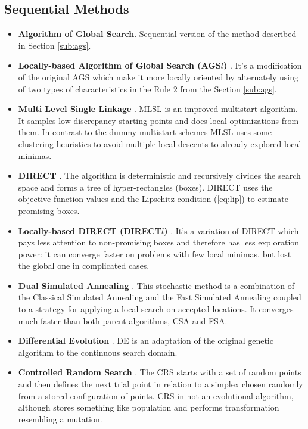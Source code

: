 \documentclass{svproc}
\begin{document}
\subsection{Sequential Methods}
\begin{itemize}
  \item \textbf{Algorithm of Global Search}. Sequential version of the method described in Section \ref{sub:ags}.

  \item \textbf{Locally-based Algorithm of Global Search (AGS\(l\))} \cite{indexMethod}. It's a modification of
  the original AGS which make it more locally oriented by alternately using of two types of characteristics in the Rule 2 from the Section \ref{sub:ags}.

  \item \textbf{Multi Level Single Linkage} \cite{Kan1987StochasticGO}. MLSL is an improved multistart algorithm.
  It samples low-discrepancy starting points and does local optimizations from them. In contrast to the dummy multistart schemes
  MLSL uses some clustering heuristics to avoid multiple local descents to already explored local minimas.

  \item \textbf{DIRECT} \cite{Jones2009}. The algorithm is deterministic and recursively divides the search space and forms a tree of hyper-rectangles (boxes). DIRECT uses the objective function values and the Lipschitz condition (\ref{eq:lip}) to estimate promising boxes.

  \item \textbf{Locally-based DIRECT (DIRECT$l$)} \cite{Gablonsky2001}. It's a variation of DIRECT which pays less attention to non-promising boxes and therefore
  has less exploration power: it can converge faster on problems with few local minimas, but lost the global one in complicated cases.

  \item \textbf{Dual Simulated Annealing} \cite{XIANG1997216}. This stochastic method is a combination of the Classical Simulated Annealing and the Fast Simulated Annealing coupled to a strategy for applying a local search on accepted locations. It converges much faster than both parent algorithms, CSA and FSA.

  \item \textbf{Differential Evolution} \cite{Storn1997}. DE is an adaptation of the original genetic algorithm to
  the continuous search domain.

  \item \textbf{Controlled Random Search} \cite{Price1983}. The CRS starts with a set of random points and then defines
  the next trial point in relation to a simplex chosen randomly from a stored configuration of points. CRS in not an
  evolutional algorithm, although stores something like population and performs transformation resembling a mutation.


\end{itemize}
\end{document}
